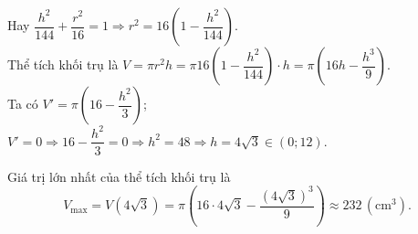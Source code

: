 \documentclass[12pt,a4paper,openany,twoside]{book}
\begin{document}
\begin{bt}
{	Hay  $ \dfrac{h^2}{144}+\dfrac{r^2}{16}=1\Rightarrow r^2=16\left(1-\dfrac{h^2}{144}\right)$.\\
	Thể tích khối trụ là $V=\pi r^2h=\pi16\left(1-\dfrac{h^2}{144}\right)\cdot  h=\pi\left(16h-\dfrac{h^3}{9}\right)$.\\
	Ta có $V'=\pi\left(16-\dfrac{h^2}{3}\right)$; $V'=0\Rightarrow 16-\dfrac{h^2}{3}=0\Rightarrow h^2=48\Rightarrow  h=4\sqrt{3}\in (0;12)$.\\
	\begin{center}
	\end{center}
	Giá trị lớn nhất của thể tích khối trụ là $$V_{\max}=V(4\sqrt{3})=\pi\left(16\cdot 4\sqrt{3}-\dfrac{(4\sqrt{3})^3}{9}\right)\approx 232  \,(\text{cm}^3).$$
 }
\end{bt}
\end{document}
